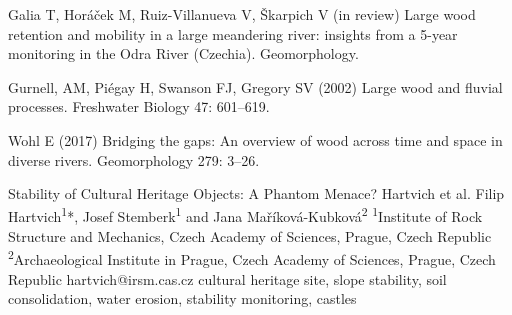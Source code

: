 {Galia T, Horáček M, Ruiz-Villanueva V, Škarpich V (in review) Large wood retention and mobility in a large meandering river: insights from a 5-year monitoring in the Odra River (Czechia). Geomorphology.
	
Gurnell, AM, Piégay H, Swanson FJ, Gregory SV (2002) Large wood and fluvial processes. Freshwater Biology 47: 601–619.
	
Wohl E (2017) Bridging the gaps: An overview of wood across time and space in diverse rivers. Geomorphology 279: 3–26.
}%

\abstract
{Stability of Cultural Heritage Objects: A Phantom Menace?} 
{Hartvich et al.} 
{Filip Hartvich\textsuperscript{1}*, Josef Stemberk\textsuperscript{1} and Jana Maříková-Kubková\textsuperscript{2}} 
{\TLtag} 
{
\textsuperscript{1}Institute of Rock Structure and Mechanics, Czech Academy of Sciences, Prague, Czech Republic
\textsuperscript{2}Archaeological Institute in Prague, Czech Academy of Sciences, Prague, Czech Republic
}
{hartvich@irsm.cas.cz}  %
{cultural heritage site, slope stability, soil consolidation, water erosion, stability monitoring, castles}
